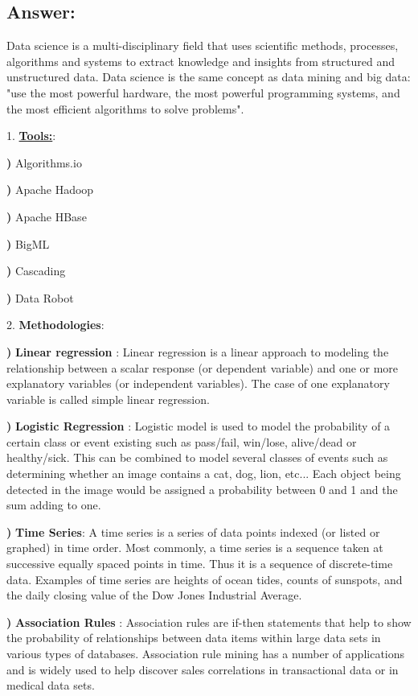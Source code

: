 \documentclass[10 pm]{article}
\begin{document}
\subsection*{Answer:}
Data science is a multi-disciplinary field that uses scientific methods, processes, algorithms and systems to extract knowledge and insights from structured and unstructured data.  Data science is the same concept as data mining and big data: "use the most powerful hardware, the most powerful programming systems, and the most efficient algorithms to solve problems".

        1. \underline{ \textbf{Tools:}}:

		\textbf{)} Algorithms.io

		\textbf{)} Apache Hadoop

		\textbf{)}  Apache HBase		
		
		\textbf{)}  BigML  	

		\textbf{)}  Cascading

		\textbf{)}  Data Robot


	2.  \textbf{Methodologies}:

\textbf{)} \textbf{Linear regression }:  Linear regression is a linear approach to modeling the relationship between a scalar response (or dependent variable) and one or more explanatory variables (or independent variables). The case of one explanatory variable is called simple linear regression.

\textbf{)} \textbf{Logistic Regression  }:  Logistic model is used to model the probability of a certain class or event existing such as pass/fail, win/lose, alive/dead or healthy/sick. This can be combined to model several classes of events such as determining whether an image contains a cat, dog, lion, etc... Each object being detected in the image would be assigned a probability between 0 and 1 and the sum adding to one.

\textbf{)} \textbf{Time Series}: A time series is a series of data points indexed (or listed or graphed) in time order. Most commonly, a time series is a sequence taken at successive equally spaced points in time. Thus it is a sequence of discrete-time data. Examples of time series are heights of ocean tides, counts of sunspots, and the daily closing value of the Dow Jones Industrial Average.	
		
\textbf{)} \textbf{Association Rules }: Association rules are if-then statements that help to show the probability of relationships between data items within large data sets in various types of databases. Association rule mining has a number of applications and is widely used to help discover sales correlations in transactional data or in medical data sets.  	
\end{document}
